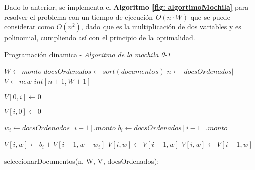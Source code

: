 Dado lo anterior, se implementa el \textbf{Algoritmo \ref{fig: algortimoMochila}} para resolver el problema con un tiempo de ejecución $O(n \cdot W)$ que se puede considerar como $O(n^2)$, dado que es la multiplicación de dos variables y es polinomial, cumpliendo así con el principio de la optimalidad.


\renewcommand{\algorithmicrequire}{\textbf{Entrada:}}
\renewcommand{\algorithmicensure}{\textbf{Salida:}}


\begin{algorithm}
    \caption{\label{fig: algortimoMochila}Programación dinamica - \textit{Algoritmo de la mochila 0-1}}
    \begin{algorithmic}[1]


    \vspace{3mm}
    \State $W \gets monto$
    \State $docsOrdenados\gets sort(documentos)$
    \State $n \gets |docsOrdenados|$
    \State $V \gets new$ $int[n + 1, W + 1]$

    \vspace{3mm}
        \State $V[0,i] \gets 0$
    \EndFor

    \vspace{3mm}
        \State $V[i,0] \gets 0$
    \EndFor

    \vspace{3mm}
            \State $w_{i} \gets docsOrdenados[i-1].monto$
            \State $b_{i} \gets docsOrdenados[i-1].monto$

                    \State $V[i,w] \gets b_{i} + V[i-1, w-w_{i}]$
                \Else
                    \State $V[i,w] \gets V[i-1,w]$
                \EndIf
            \Else
                \State $V[i,w] \gets V[i-1,w]$
            \EndIf
        \EndFor
    \EndFor

    \vspace{3mm}
    \State seleccionarDocumentos(n, W, V, docsOrdenados);
  \end{algorithmic}
\end{algorithm}


